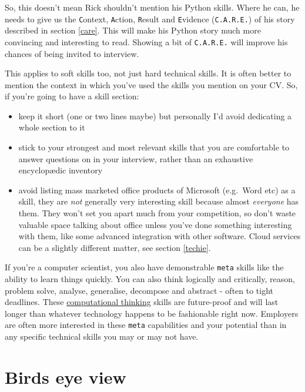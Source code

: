 \documentclass[
]{book}
\providecommand{\tightlist}{%
  \setlength{\itemsep}{0pt}\setlength{\parskip}{0pt}}
\begin{document}
So, this doesn't mean Rick shouldn't mention his Python skills. Where he can, he needs to give us the \texttt{C}ontext, \texttt{A}ction, \texttt{R}esult and \texttt{E}vidence (\texttt{C.A.R.E.}) of his story described in section \ref{care}. This will make his Python story much more convincing and interesting to read. Showing a bit of \texttt{C.A.R.E.} will improve his chances of being invited to interview.

This applies to soft skills too, not just hard technical skills. It is often better to mention the context in which you've used the skills you mention on your CV. So, if you're going to have a skill section:

\begin{itemize}
\tightlist
\item
  keep it short (one or two lines maybe) but personally I'd avoid dedicating a whole section to it
\item
  stick to your strongest and most relevant skills that you are comfortable to answer questions on in your interview, rather than an exhaustive encyclopædic inventory
\item
  avoid listing mass marketed office products of Microsoft (e.g.~Word etc) as a skill, they are \emph{not} generally very interesting skill because almost \emph{everyone} has them. They won't set you apart much from your competition, so don't waste valuable space talking about office unless you've done something interesting with them, like some advanced integration with other software. Cloud services can be a slightly different matter, see section \ref{techie}.
\end{itemize}

If you're a computer scientist, you also have demonstrable \texttt{meta} skills like the ability to learn things quickly. You can also think logically and critically, reason, problem solve, analyse, generalise, decompose and abstract - often to tight deadlines. These \href{https://en.wikipedia.org/wiki/Computational_thinking}{computational thinking} skills are future-proof and will last longer than whatever technology happens to be fashionable right now. Employers are often more interested in these \texttt{meta} capabilities and your potential than in any specific technical skills you may or may not have.

\hypertarget{birds-eye-view}{%
\section{Birds eye view}\label{birds-eye-view}}
\end{document}
